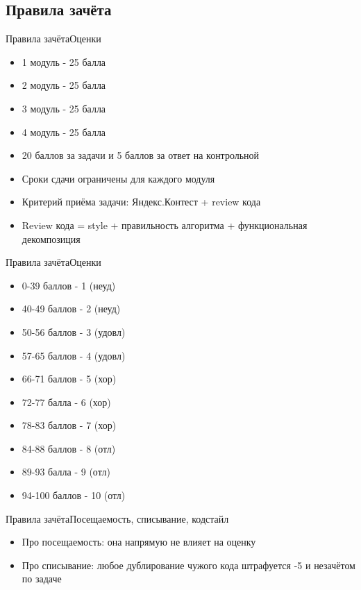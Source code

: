 \documentclass[10pt]{beamer}
\begin{document}
\subsection{Правила зачёта}
\begin{frame}[fragile]{Правила зачёта}{Оценки}
\begin{itemize}
\item 1 модуль - 25 балла
\item 2 модуль - 25 балла
\item 3 модуль - 25 балла
\item 4 модуль - 25 балла
\item 20 баллов за задачи и 5 баллов за ответ на контрольной
\item Сроки сдачи ограничены для каждого модуля
\item Критерий приёма задачи: Яндекс.Контест + review кода
\item Review кода = style + правильность алгоритма + функциональная декомпозиция
\end{itemize}
\end{frame}


\begin{frame}[fragile]{Правила зачёта}{Оценки}
\begin{itemize}
\item 0-39 баллов - 1 (неуд)
\item 40-49 баллов - 2 (неуд)
\item 50-56 баллов - 3 (удовл)
\item 57-65 баллов - 4 (удовл)
\item 66-71 баллов - 5 (хор)
\item 72-77 балла - 6 (хор)
\item 78-83 баллов - 7 (хор)
\item 84-88 баллов - 8 (отл)
\item 89-93 балла - 9 (отл)
\item 94-100 баллов - 10 (отл)
\end{itemize}
\end{frame}

\begin{frame}[fragile]{Правила зачёта}{Посещаемость, списывание, кодстайл}
\begin{itemize}
\item Про посещаемость: она напрямую не влияет на оценку
\item Про списывание: любое дублирование чужого кода штрафуется -5 и незачётом по задаче
\end{itemize}
\end{frame}
\end{document}
